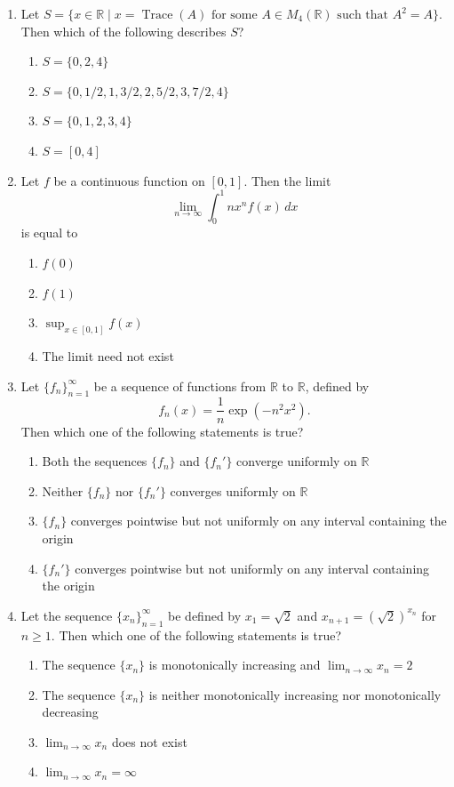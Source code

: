 \documentclass[11pt, a4paper]{article}
\begin{document}
\begin{enumerate}
  \item Let $S = \{x \in \mathbb{R} \mid x = \operatorname{Trace}(A) \text{ for some } A \in M_4(\mathbb{R}) \text{ such that } A^2 = A\}$. Then which of the following describes $S$?
  \begin{enumerate}[label=(\alph*)]
    \item $S = \{0, 2, 4\}$
    \item $S = \{0, 1/2, 1, 3/2, 2, 5/2, 3, 7/2, 4\}$
    \item $S = \{0, 1, 2, 3, 4\}$
    \item $S = [0, 4]$
  \end{enumerate}

  \item Let $f$ be a continuous function on $[0,1]$. Then the limit
  \[
    \lim_{n \to \infty} \int_0^1 n x^n f(x)\,dx
  \]
  is equal to
  \begin{enumerate}[label=(\alph*)]
    \item $f(0)$
    \item $f(1)$
    \item $\sup_{x \in [0,1]} f(x)$
    \item The limit need not exist
  \end{enumerate}

  \item Let $\{f_n\}_{n=1}^\infty$ be a sequence of functions from $\mathbb{R}$ to $\mathbb{R}$, defined by
  \[
    f_n(x) = \frac{1}{n} \exp(-n^2 x^2).
  \]
  Then which one of the following statements is true?
  \begin{enumerate}[label=(\alph*)]
    \item Both the sequences $\{f_n\}$ and $\{f_n'\}$ converge uniformly on $\mathbb{R}$
    \item Neither $\{f_n\}$ nor $\{f_n'\}$ converges uniformly on $\mathbb{R}$
    \item $\{f_n\}$ converges pointwise but not uniformly on any interval containing the origin
    \item $\{f_n'\}$ converges pointwise but not uniformly on any interval containing the origin
  \end{enumerate}

  \item Let the sequence $\{x_n\}_{n=1}^\infty$ be defined by $x_1 = \sqrt{2}$ and $x_{n+1} = (\sqrt{2})^{x_n}$ for $n \ge 1$. Then which one of the following statements is true?
  \begin{enumerate}[label=(\alph*)]
    \item The sequence $\{x_n\}$ is monotonically increasing and $\lim_{n \to \infty} x_n = 2$
    \item The sequence $\{x_n\}$ is neither monotonically increasing nor monotonically decreasing
    \item $\lim_{n \to \infty} x_n$ does not exist
    \item $\lim_{n \to \infty} x_n = \infty$
  \end{enumerate}


\end{enumerate}
\end{document}
